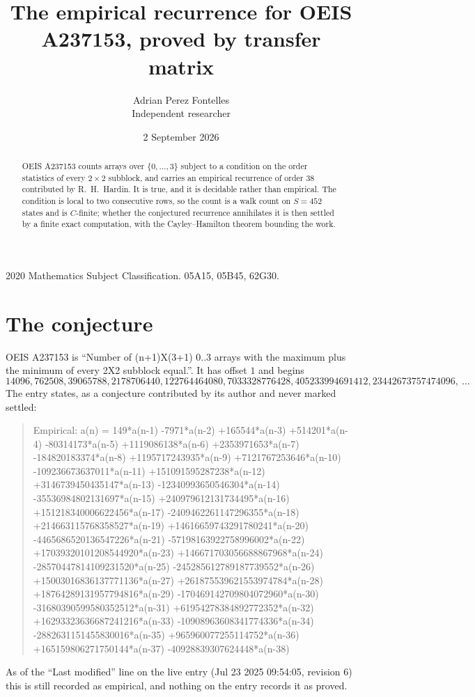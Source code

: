 \documentclass[11pt,a4paper]{article}
\title{The empirical recurrence for OEIS A237153, proved by transfer matrix}
\author{Adrian Perez Fontelles\\ \small Independent researcher}
\date{2 September 2026}
\theoremstyle{plain}
\theoremstyle{definition}
\begin{document}
\maketitle

\begin{abstract}
OEIS A237153 counts arrays over $\{0,\dots,3\}$ subject to a condition on the order
statistics of every $2\times2$ subblock, and carries an empirical recurrence of order
$38$ contributed by R.~H.~Hardin. It is true, and it is decidable rather than empirical.
The condition is local to two consecutive rows, so the count is a walk count on $S=452$
states and is $C$-finite; whether the conjectured recurrence annihilates it is then settled by
a finite exact computation, with the Cayley--Hamilton theorem bounding the work.
\end{abstract}

\noindent\small 2020 Mathematics Subject Classification. 05A15, 05B45, 62G30.\normalsize

\section{The conjecture}

OEIS A237153 is ``Number of (n+1)X(3+1) 0..3 arrays with the maximum plus the minimum of every 2X2 subblock equal.''. It has offset $1$ and begins
\[
14096, 762508, 39065788, 2178706440, 122764464080, 7033328776428, 405233994691412, 23442673757474096,\ \dots
\]
The entry states, as a conjecture contributed by its author and never marked settled:
\begin{quote}
Empirical: a(n) = 149*a(n-1) -7971*a(n-2) +165544*a(n-3) +514201*a(n-4) -80314173*a(n-5) +1119086138*a(n-6) +2353971653*a(n-7) -184820183374*a(n-8) +1195717243935*a(n-9) +7121767253646*a(n-10) -109236673637011*a(n-11) +151091595287238*a(n-12) +3146739450435147*a(n-13) -12340993650546304*a(n-14) -35536984802131697*a(n-15) +240979612131734495*a(n-16) +151218340006622456*a(n-17) -2409462261147296355*a(n-18) +214663115768358527*a(n-19) +14616659743291780241*a(n-20) -4465686520136547226*a(n-21) -57198163922758996002*a(n-22) +17039320101208544920*a(n-23) +146671703056688867968*a(n-24) -28570447814109231520*a(n-25) -245285612789187739552*a(n-26) +15003016836137771136*a(n-27) +261875539621553974784*a(n-28) +18764289131957794816*a(n-29) -170469142709804072960*a(n-30) -31680390599580352512*a(n-31) +61954278384892772352*a(n-32) +16293323636687241216*a(n-33) -10908963608341774336*a(n-34) -2882631151455830016*a(n-35) +965960077255114752*a(n-36) +165159806271750144*a(n-37) -40928839307624448*a(n-38)
\end{quote}
As of the ``Last modified'' line on the live entry (Jul 23 2025 09:54:05, revision 6) this is still
recorded as empirical, and nothing on the entry records it as proved.
\end{document}
